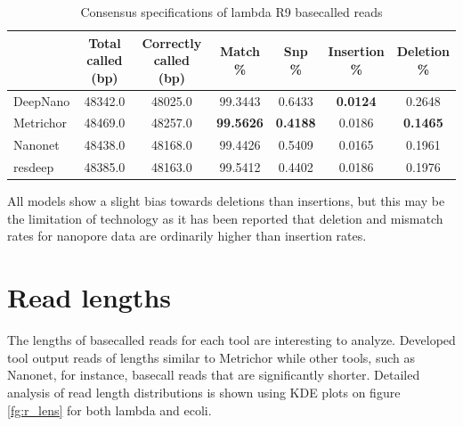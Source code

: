 \documentclass[times, utf8, diplomski, numeric, english]{fer}
\begin{document}
\begin{table}[htb]
	\caption{Consensus specifications of lambda R9 basecalled reads}
	\label{tbl:spec_lambda}
	\centering
	
	\begin{tabular}{lcccccc}
		\toprule
		{} &  \thead{Total called\\(bp)} &  \thead{Correctly called\\(bp)} &  \thead{Match\\\%} &  \thead{Snp\\\%} &  \thead{Insertion\\\%} &  \thead{Deletion\\\%} \\
		\midrule
		DeepNano  &                    48342.0 &                        48025.0 &          99.3443 &         0.6433 &               \textbf{0.0124} &              0.2648 \\
		Metrichor &                    48469.0 &                        48257.0 &          \textbf{99.5626} &         \textbf{0.4188} &               0.0186 &              \textbf{0.1465} \\
		Nanonet   &                    48438.0 &                        48168.0 &          99.4426 &         0.5409 &               0.0165 &              0.1961 \\
		resdeep   &                    48385.0 &                        48163.0 &          99.5412 &         0.4402 &               0.0186 &              0.1976 \\
		\bottomrule
	\end{tabular}
\end{table}

All models show a slight bias towards deletions than insertions, but this may be the limitation of technology as it has been reported that deletion and mismatch rates for nanopore data are ordinarily higher than insertion rates\cite{sovic}.


\section{Read lengths}
The lengths of basecalled reads for each tool are interesting to analyze. Developed tool output reads of lengths similar to Metrichor while other tools, such as Nanonet, for instance, basecall reads that are significantly shorter. Detailed analysis of read length distributions is shown using KDE plots on figure \ref{fg:r_lens} for both lambda and ecoli.
\end{document}
